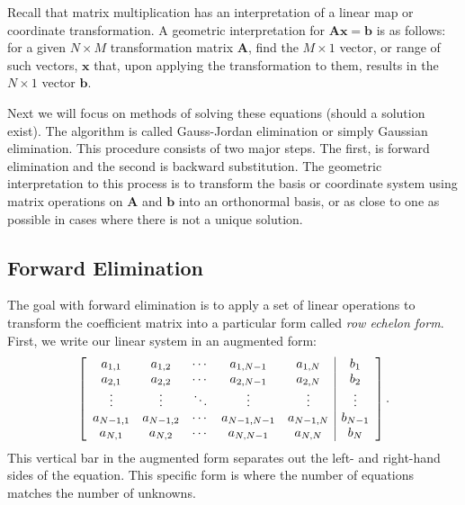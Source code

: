Recall that matrix multiplication has an interpretation of a linear map or coordinate transformation. A geometric interpretation for $\mathbf{Ax} = \mathbf{b}$ is as follows: for a given $N \times M$ transformation matrix $\mathbf{A}$, find the $M \times 1$ vector, or range of such vectors, $\mathbf{x}$ that, upon applying the transformation to them, results in the $N \times 1$ vector $\mathbf{b}$.

Next we will focus on methods of solving these equations (should a solution exist). The algorithm is called Gauss-Jordan elimination or simply Gaussian elimination. This procedure consists of two major steps. The first, is forward elimination and the second is backward substitution. The geometric interpretation to this process is to transform the basis or coordinate system using matrix operations on $\mathbf{A}$ and $\mathbf{b}$ into an orthonormal basis, or as close to one as possible in cases where there is not a unique solution.

\subsection{Forward Elimination} \label{Sec:linearAlgebra_ForwardElimination}

The goal with forward elimination is to apply a set of linear operations to transform the coefficient matrix into a particular form called \emph{row echelon form}. First, we write our linear system in an augmented form:
\begin{align}
  \left[ \begin{array}{c c c c c | c} a_{1,1} & a_{1,2} & \cdots & a_{1,N-1} & a_{1,N} & b_1 \\
  								      a_{2,1} & a_{2,2} & \cdots & a_{2,N-1} & a_{2,N} & b_2 \\
								      \vdots  & \vdots  & \ddots & \vdots    & \vdots  & \vdots \\
									  a_{N-1,1} & a_{N-1,2} & \cdots & a_{N-1,N-1} & a_{N-1,N} & b_{N-1} \\ 
								      a_{N,1} & a_{N,2} & \cdots & a_{N,N-1} & a_{N,N} & b_N \\ \end{array} \right] . \nonumber
\end{align}
This vertical bar in the augmented form separates out the left- and right-hand sides of the equation. This specific form is where the number of equations matches the number of unknowns.

